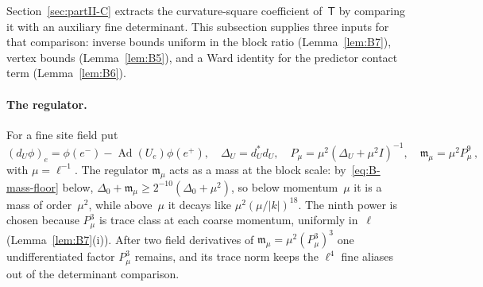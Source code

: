 Section~\ref{sec:partII-C} extracts the curvature-square coefficient of~$\mathsf T$ by comparing it with an auxiliary fine determinant. This subsection supplies three inputs for that comparison: inverse bounds uniform in the block ratio (Lemma~\ref{lem:B7}), vertex bounds (Lemma~\ref{lem:B5}), and a Ward identity for the predictor contact term (Lemma~\ref{lem:B6}).

\paragraph{The regulator.} For a fine site field put
\begin{equation*}
(d_U\phi)_e=\phi(e^-)-\operatorname{Ad}(U_e)\phi(e^+),\quad
\Delta_U=d_U^*d_U,\quad P_\mu=\mu^2(\Delta_U+\mu^2I)^{-1},\quad
\mathfrak m_\mu=\mu^2P_\mu^9\,,
\end{equation*}
with $\mu=\ell^{-1}$. The regulator $\mathfrak m_\mu$ acts as a mass at the block scale: by~\eqref{eq:B-mass-floor} below, $\Delta_0+\mathfrak m_\mu\ge2^{-10}(\Delta_0+\mu^2)$, so below momentum~$\mu$ it is a mass of order~$\mu^2$, while above~$\mu$ it decays like $\mu^2(\mu/|k|)^{18}$. The ninth power is chosen because $P_\mu^3$ is trace class at each coarse momentum, uniformly in~$\ell$ (Lemma~\ref{lem:B7}(i)). After two field derivatives of $\mathfrak m_\mu=\mu^2(P_\mu^3)^3$ one undifferentiated factor $P_\mu^3$ remains, and its trace norm keeps the $\ell^4$ fine aliases out of the determinant comparison.

